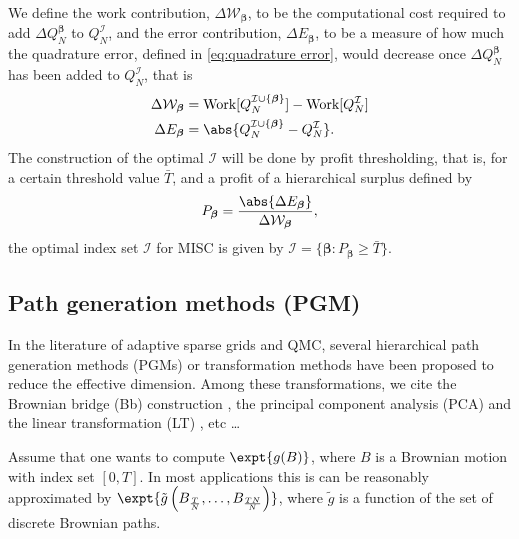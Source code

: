 We define the work contribution, $\Delta \mathcal{W}_{\boldsymbol{\beta}}$, to be the computational cost  required to add  $\Delta Q_N^{\boldsymbol{\beta}}$ to $Q^{\mathcal{I}}_N$, and the error contribution, $\Delta E_{\boldsymbol{\beta}}$, to be  a measure of how much the quadrature error, defined in \eqref{eq:quadrature error}, would decrease once $\Delta Q_N^{\boldsymbol{\beta}}$  has been added to  $Q^{\mathcal{I}}_N$, that is 
\begin{align}\label{eq:Work_error_contributions}
\Delta \mathcal{W}_{\boldsymbol{\beta}} &= \text{Work}[Q^{\mathcal{I} \cup \{\boldsymbol{\beta}\}}_N]-\text{Work}[Q^{\mathcal{I}}_N] \nonumber\\
\Delta E_{\boldsymbol{\beta}} &= \abs{Q^{\mathcal{I} \cup \{\boldsymbol{\beta}\}}_N-Q^{\mathcal{I}}_N}.
\end{align}
 The  construction of the optimal  $\mathcal{I}$ will be done by profit thresholding, that is, for a certain threshold value $\bar{T}$, and a profit of a hierarchical surplus defined by
 \begin{equation*}
 P_{\boldsymbol{\beta}}= \frac{\abs{\Delta E_{\boldsymbol{\beta}}}}{\Delta\mathcal{W}_{\boldsymbol{\beta}}},
 \end{equation*}
  the optimal index set  $\mathcal{I}$  for MISC  is given by 
 $\mathcal{I}=\{\boldsymbol{\beta}: P_{\boldsymbol{\beta}}	 \ge \bar{T}\}$.
 
 
\subsection{Path generation methods (PGM)}\label{sec:Path generation methods (PGM)}

In the literature of adaptive sparse grids and  QMC, several hierarchical path generation methods (PGMs) or transformation methods have been proposed to reduce the effective dimension. Among these transformations, we cite the Brownian bridge (Bb)  construction \cite{moskowitz1996smoothness,caflisch1997valuation,morokoff1998generating,larcher2003tractability}, the principal component analysis (PCA)  \cite{acworth1998comparison} and the linear transformation (LT) \cite{imai2004minimizing}, etc \dots 

Assume that one wants to compute $\expt{g(B)}$, where $B$ is a Brownian motion with index set $[0,T]$. In most applications this is can be reasonably approximated by $\expt{\tilde{g}\left(B_{\frac{T}{N}}, \dots, B_{\frac{T N}{N}}  \right)}$, where $\tilde{g}$ is a function of the set of discrete Brownian paths.

